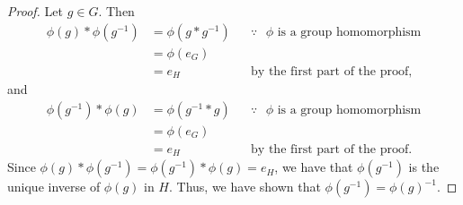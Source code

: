 \documentclass[
  coursecode={MTHE 418},
  assignmentname={Homework \homeworknumber},
  studentnumber=20053722,
  name={Bryan Hoang},
  draft,
]{
  ltxanswer%
}
\begin{document}
\begin{questions}
\begin{parts}
\begin{solution}
\begin{proof}
          Let \(g \in G\). Then
          \begin{align*}
            \phi(g) * \phi(g^{-1}) &= \phi(g * g^{-1}) & &\because \text{ \(\phi\) is a group homomorphism} \\
                                   &= \phi(e_{G})                                                           \\
                                   &= e_{H}            & &\text{by the first part of the proof,}
          \end{align*}
          and
          \begin{align*}
            \phi(g^{-1})  * \phi(g) &= \phi(g^{-1} * g) & &\because \text{ \(\phi\) is a group homomorphism} \\
                                    &= \phi(e_{G})                                                           \\
                                    &= e_{H}            & &\text{by the first part of the proof.}
          \end{align*}
          Since \(\phi(g) * \phi(g^{-1}) = \phi(g^{-1})  * \phi(g) = e_{H}\), we have that \(\phi(g^{-1})\) is the unique inverse of \(\phi(g)\) in \(H\). Thus, we have shown that \(\phi(g^{-1}) = \phi(g)^{-1}\).
        \end{proof}
      \end{solution}


\end{parts}
\end{questions}
\end{document}

